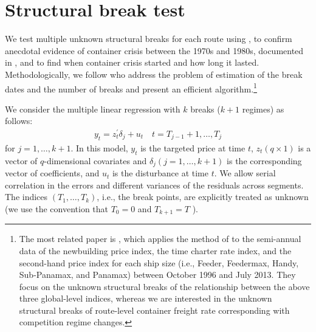 \documentclass[11pt]{article}
\begin{document}

\section{Structural break test}\label{sec:structural_break_test}

We test multiple unknown structural breaks for each route using \cite{bai1998estimating,bai2003computation}, to confirm anecdotal evidence of container crisis between the 1970s and 1980s, documented in \cite{broeze2002globalisation}, and to find when container crisis started and how long it lasted. Methodologically, we follow \cite{bai2003computation} who address the problem of estimation of the break dates and the number of breaks and present an efficient algorithm.\footnote{The most related paper is \cite{fan2016analysis}, which applies the method of \cite{bai2003computation} to the semi-annual data of the newbuilding price index, the time charter rate index, and the second-hand price index for each ship size (i.e., Feeder, Feedermax, Handy, Sub-Panamax, and Panamax) between October 1996 and July 2013. They focus on the unknown structural breaks of the relationship between the above three global-level indices, whereas we are interested in the unknown structural breaks of route-level container freight rate corresponding with competition regime changes.} 

We consider the multiple linear regression with $k$ breaks ($k + 1$ regimes) as follows:
\begin{align}
    y_{t}=z_{t}^{\prime} \delta_{j}+u_{t} \quad t=T_{j-1}+1, \ldots, T_{j}\label{eq:bai_and_perron}
\end{align}
for $j=1, \ldots, k+1$. In this model, $y_{t}$ is the targeted price at time $t$, $z_{t}(q \times 1)$ is a vector of $q$-dimensional covariates and $\delta_{j}(j=1, \ldots, k+1)$ is the corresponding vector of coefficients, and $u_{t}$ is the disturbance at time $t$. We allow serial correlation in the errors and different variances of the residuals across segments. The indices $\left(T_{1}, \ldots, T_{k}\right)$, i.e., the break points, are explicitly treated as unknown (we use the convention that $T_{0}=0$ and $T_{k+1}=T$ ). 
\end{document}
